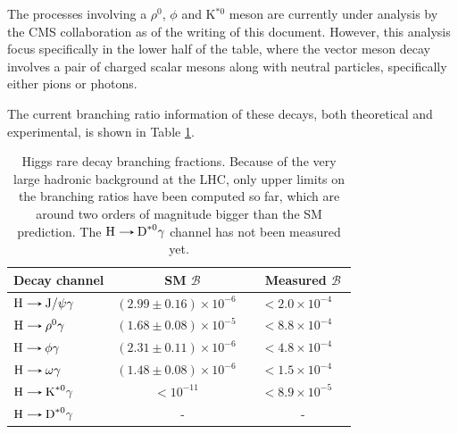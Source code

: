 The processes involving a $\rho^0$, $\phi$ and K$^{*0}$ meson are currently under analysis by the CMS collaboration as of the writing of this document. However, this analysis focus specifically in the lower half of the table, where the vector meson decay involves a pair of charged scalar mesons along with neutral particles, specifically either pions or photons.

The current branching ratio information of these decays, both theoretical and experimental, is shown in Table \ref{tab:Higgs_rare_decays_values}.
\begin{table}[!ht]
    \centering
    \begin{tabular}{|l|cc|cc|}
        \hline
        \multicolumn{1}{|c|}{\cellcolor{lightgray}Decay channel} & \multicolumn{2}{c|}{\cellcolor{lightgray} SM $\mathcal{B}$} & \multicolumn{2}{c|}{\cellcolor{lightgray} Measured $\mathcal{B}$} \\ \hline
        $\text{H}\decaysto \text{J}/\psi\gamma$    & $(2.99 \pm 0.16)\times 10^{-6}$    & \cite{Bodwin:2017wdu} & $< 2.0 \times 10^{-4}$ & \cite{ATLAS:2022rej}  \\
        $\text{H}\decaysto \rho^0\gamma$    & $(1.68 \pm 0.08)\times 10^{-5}$    & \cite{Konig:2015qat} & $< 8.8 \times 10^{-4}$ & \cite{ATLAS:2017gko}  \\
        $\text{H}\decaysto \phi\gamma$      & $(2.31 \pm 0.11)\times 10^{-6}$    & \cite{Konig:2015qat} & $< 4.8 \times 10^{-4}$ & \cite{ATLAS:2017gko}  \\
        $\text{H}\decaysto \omega\gamma$    & $(1.48 \pm 0.08)\times 10^{-6}$    & \cite{Konig:2015qat} & $< 1.5 \times 10^{-4}$ & \cite{ATLAS:2023alf}  \\
        $\text{H}\decaysto \text{K}^{*0}\gamma$    & $< 10^{-11}$                       & \cite{ATLAS:2023alf} & $< 8.9 \times 10^{-5}$ & \cite{ATLAS:2023alf}  \\
        $\text{H}\decaysto \text{D}^{*0}\gamma$    & \multicolumn{2}{c|}{-}             & \multicolumn{2}{c|}{-}  \\ \hline
    \end{tabular}
    \caption{Higgs rare decay branching fractions. Because of the very large hadronic background at the LHC, only upper limits on the branching ratios have been computed so far, which are around two orders of magnitude bigger than the SM prediction. The $\text{H}\protect\decaysto \text{D}^{*0}\gamma$ channel has not been measured yet.}
    \label{tab:Higgs_rare_decays_values}
\end{table}
